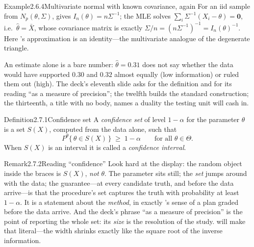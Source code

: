 \documentclass[main.tex]{subfiles}
\begin{document}
\begin{ObjL}{Example}{2.6.4}{Multivariate normal with known covariance, again}
For an iid sample from $N_p(\theta,\Sigma)$,  gives $I_n(\theta)=n\Sigma^{-1}$;
the MLE solves $\sum_i \Sigma^{-1}(X_i-\theta)=\mathbf 0$, i.e.\ $\hat\theta=\bar X$, whose
covariance matrix is exactly $\Sigma/n=(n\Sigma^{-1})^{-1}=I_n(\theta)^{-1}$. Here
's approximation is an identity---the multivariate analogue of the degenerate
triangle.
\end{ObjL}


An estimate alone is a bare number: $\hat\theta=0.31$ does not say whether the data would
have supported $0.30$ and $0.32$ almost equally (low information) or ruled them out (high).
The deck's eleventh slide asks for the definition and for its reading ``as a measure of
precision''; the twelfth builds the standard construction; the thirteenth, a title with no
body, names a duality the testing unit will cash in.

\begin{Obj}{Definition}{2.7.1}{Confidence set}
A \emph{confidence set} of level $1-\alpha$ for the parameter $\theta$ is a set $S(X)$,
computed from the data alone, such that
\[ P^{\theta}\big\{\, \theta \in S(X) \,\big\} \;\ge\; 1-\alpha
   \qquad\text{for all } \theta\in\Theta . \]
When $S(X)$ is an interval it is called a \emph{confidence interval}.
\end{Obj}

\begin{ObjL}{Remark}{2.7.2}{Reading ``confidence''}
Look hard at the display: the random object inside the braces is $S(X)$, \emph{not}
$\theta$. The parameter sits still; the \emph{set} jumps around with the data; the
guarantee---at every candidate truth, and before the data arrive---is that the procedure's
set captures the truth with probability at least $1-\alpha$. It is a statement about the
\emph{method}, in exactly 's sense of a plan graded before the data
arrive.
And the deck's phrase ``as a measure of precision'' is the point of reporting the whole set:
its \emph{size} is the resolution of the study.  will make that literal---the
width shrinks exactly like the square root of the inverse information.
\end{ObjL}
\end{document}
